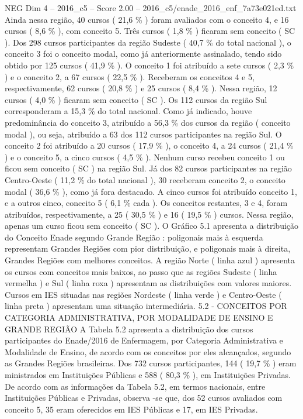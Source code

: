 \begin{textsample}{NEG Dim 4 – 2016\_c5 – Score 2.00 – 2016\_c5/enade\_2016\_enf\_7a73e021ed.txt}
Ainda nessa região, 40 cursos ( 21,6 \% ) foram avaliados com o conceito 4, e 16 cursos ( 8,6 \% ), com conceito 5.
Três cursos ( 1,8 \% ) ficaram sem conceito ( SC ).
Dos 298 cursos participantes da região Sudeste ( 40,7 \% do total nacional ), o conceito 3 foi o conceito modal, como já anteriormente assinalado, tendo sido obtido por 125 cursos ( 41,9 \% ).
O conceito 1 foi atribuído a sete cursos ( 2,3 \% ) e o conceito 2, a 67 cursos ( 22,5 \% ).
Receberam os conceitos 4 e 5, respectivamente, 62 cursos ( 20,8 \% ) e 25 cursos ( 8,4 \% ).
Nessa região, 12 cursos ( 4,0 \% ) ficaram sem conceito ( SC ).
Os 112 cursos da região Sul corresponderam a 15,3 \% do total nacional.
Como já indicado, houve predominância do conceito 3, atribuído a 56,3 \% dos cursos da região ( conceito modal ), ou seja, atribuído a 63 dos 112 cursos participantes na região Sul.
O conceito 2 foi atribuído a 20 cursos ( 17,9 \% ), o conceito 4, a 24 cursos ( 21,4 \% ) e o conceito 5, a cinco cursos ( 4,5 \% ).
Nenhum curso recebeu conceito 1 ou ficou sem conceito ( SC ) na região Sul.
Já dos 82 cursos participantes na região Centro-Oeste ( 11,2 \% do total nacional ), 30 receberam conceito 2, o conceito modal ( 36,6 \% ), como já fora destacado.
A cinco cursos foi atribuído conceito 1, e a outros cinco, conceito 5 ( 6,1 \% cada ).
Os conceitos restantes, 3 e 4, foram atribuídos, respectivamente, a 25 ( 30,5 \% ) e 16 ( 19,5 \% ) cursos.
Nessa região, apenas um curso ficou sem conceito ( SC ).
O Gráfico 5.1 apresenta a distribuição do Conceito Enade segundo Grande Região : poligonais mais à esquerda representam Grandes Regiões com pior distribuição, e poligonais mais à direita, Grandes Regiões com melhores conceitos.
A região Norte ( linha azul ) apresenta os cursos com conceitos mais baixos, ao passo que as regiões Sudeste ( linha vermelha ) e Sul ( linha roxa ) apresentam as distribuições com valores maiores.
Cursos em IES situadas nas regiões Nordeste ( linha verde ) e Centro-Oeste ( linha preta ) apresentam uma situação intermediária. 5.2 - CONCEITOS POR CATEGORIA ADMINISTRATIVA, POR MODALIDADE DE ENSINO E GRANDE REGIÃO A Tabela 5.2 apresenta a distribuição dos cursos participantes do Enade/2016 de Enfermagem, por Categoria Administrativa e Modalidade de Ensino, de acordo com os conceitos por eles alcançados, segundo as Grandes Regiões brasileiras.
Dos 732 cursos participantes, 144 ( 19,7 \% ) eram ministrados em Instituições Públicas e 588 ( 80,3 \% ), em Instituições Privadas.
De acordo com as informações da Tabela 5.2, em termos nacionais, entre Instituições Públicas e Privadas, observa -se que, dos 52 cursos avaliados com conceito 5, 35 eram oferecidos em IES Públicas e 17, em IES Privadas.

\end{textsample}
